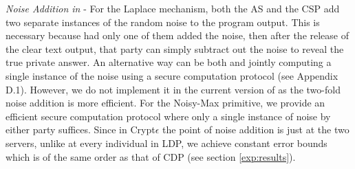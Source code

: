  \textit{Noise Addition in \system} - For the Laplace mechanism, both the \textsf{AS} and the \textsf{CSP} add two separate instances of the random noise to the program output. This is necessary because had only one of them added the noise, then after the release of the clear text output, that party can simply subtract out the noise to reveal the true private answer. An alternative way can be both \AS and \CSP jointly computing a single instance of the noise using a secure computation protocol (see Appendix D.1). However, we do not implement it in the current version of \system as the two-fold noise addition is more efficient. For the Noisy-Max primitive, we provide an efficient secure computation protocol where only a single instance of noise by either party suffices. 
Since in Crypt$\epsilon$ the point of noise addition is just at the two servers, unlike at every individual in \textsf{LDP}, we achieve constant error bounds which is of the same order as that of \textsf{CDP} (see section \ref{exp:results}). 
